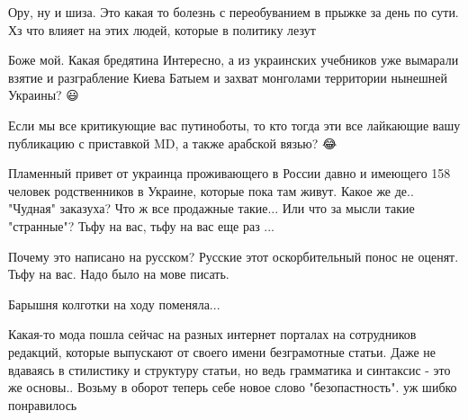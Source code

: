 \begin{itemize}
\begin{itemize}
\end{itemize}

\par
 
Ору, ну и шиза. Это какая то болезнь с переобуванием в прыжке за день по сути.
Хз что влияет на этих людей, которые в политику лезут

%
%

Боже мой. Какая бредятина \Smiley[1.0][yellow] Интересно, а из украинских учебников уже вымарали
взятие и разграбление Киева Батыем и захват монголами территории нынешней
Украины? 😃


 
Если мы все критикующие вас путиноботы, то кто тогда эти все лайкающие вашу
публикацию с приставкой MD, а также арабской вязью? 😂

%
%

Пламенный привет от украинца проживающего в России давно и имеющего 158 человек
родственников в Украине, которые пока там живут. Какое же де.. "Чудная"
заказуха? Что ж все продажные такие... Или что за мысли такие "странные"? Тьфу
на вас, тьфу на вас еще раз ...

 
Почему это написано на русском? Русские этот оскорбительный понос не оценят. Тьфу на вас. Надо было на мове писать.

 
Барышня колготки на ходу поменяла... \Smiley[1.0][yellow]

 
Какая-то мода пошла сейчас на разных интернет порталах на сотрудников редакций, которые выпускают от своего имени безграмотные статьи. Даже не вдаваясь в стилистику и структуру статьи, но ведь грамматика и синтаксис - это же основы.. Возьму в оборот теперь себе новое слово "безопастность". уж шибко понравилось \Smiley[1.0][yellow]


\end{itemize}

